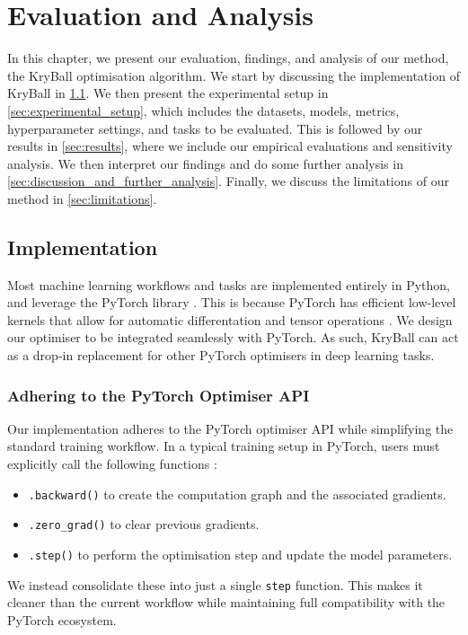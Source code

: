 \chapter{Evaluation and Analysis}
\label{chap:evaluation}

In this chapter, we present our evaluation, findings, and analysis of our method, the KryBall optimisation algorithm. We start by discussing the implementation of KryBall in \ref{sec:implementation}. We then present the experimental setup in \ref{sec:experimental_setup}, which includes the datasets, models, metrics, hyperparameter settings, and tasks to be evaluated. This is followed by our results in \ref{sec:results}, where we include our empirical evaluations and sensitivity analysis. We then interpret our findings and do some further analysis in \ref{sec:discussion_and_further_analysis}. Finally, we discuss the limitations of our method in \ref{sec:limitations}.

\section{Implementation}
\label{sec:implementation}

Most machine learning workflows and tasks are implemented entirely in Python, and leverage the PyTorch library \citep{pytorch}. This is because PyTorch has efficient low-level kernels that allow for automatic differentation and tensor operations \citep{pytorch}. We design our optimiser to be integrated seamlessly with PyTorch. As such, KryBall can act as a drop-in replacement for other PyTorch optimisers in deep learning tasks.

\subsection{Adhering to the PyTorch Optimiser API}
\label{ssec:adhering_to_the_pytorch_optimiser_api}

Our implementation adheres to the PyTorch optimiser API while simplifying the standard training workflow. In a typical training setup in PyTorch, users must explicitly call the following functions \citep{pytorch}:
\begin{itemize}
    \item \verb|.backward()| to create the computation graph and the associated gradients.
    \item \verb|.zero_grad()| to clear previous gradients.
    \item \verb|.step()| to perform the optimisation step and update the model parameters.
\end{itemize}
We instead consolidate these into just a single \verb|step| function. This makes it cleaner than the current workflow while maintaining full compatibility with the PyTorch ecosystem.


